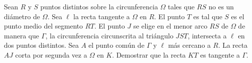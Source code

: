 Sean $R$ y $S$ puntos distintos sobre la circunferencia $\Omega$ tales que $RS$ no es un diámetro de $\Omega$. Sea $\ell$ la recta tangente a $\Omega$ en $R$. El punto $T$ es tal que $S$ es el punto medio del segmento $RT$. El punto $J$ se elige en el menor arco $RS$ de $\Omega$ de manera que $\Gamma$, la circunferencia circunscrita al triángulo $JST$, intersecta a $\ell$ en dos puntos distintos. Sea $A$ el punto común de $\Gamma$ y $\ell$ más cercano a $R$. La recta $AJ$ corta por segunda vez a $\Omega$ en $K$. Demostrar que la recta $KT$ es tangente a $\Gamma$.